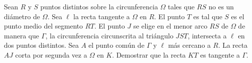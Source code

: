 Sean $R$ y $S$ puntos distintos sobre la circunferencia $\Omega$ tales que $RS$ no es un diámetro de $\Omega$. Sea $\ell$ la recta tangente a $\Omega$ en $R$. El punto $T$ es tal que $S$ es el punto medio del segmento $RT$. El punto $J$ se elige en el menor arco $RS$ de $\Omega$ de manera que $\Gamma$, la circunferencia circunscrita al triángulo $JST$, intersecta a $\ell$ en dos puntos distintos. Sea $A$ el punto común de $\Gamma$ y $\ell$ más cercano a $R$. La recta $AJ$ corta por segunda vez a $\Omega$ en $K$. Demostrar que la recta $KT$ es tangente a $\Gamma$.